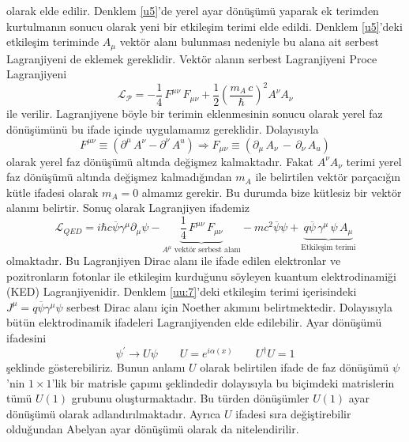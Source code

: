olarak elde edilir. Denklem \eqref{u5}'de yerel ayar dönüşümü yaparak ek terimden kurtulmanın sonucu olarak yeni bir etkileşim terimi elde edildi.  Denklem \eqref{u5}'deki etkileşim teriminde $A_{\mu}$ vektör alanı bulunması nedeniyle bu alana ait serbest Lagranjiyeni de eklemek gereklidir. Vektör alanın serbest Lagranjiyeni Proce Lagranjiyeni 
\begin{equation} \label{u6}
\mathcal{L_{P}} = -\frac{1}{4}\,F^{\mu\nu}\,F_{\mu\nu} + \frac{1}{2}\left(\frac{m_{A}\,c}{\hbar}\right)^{2}A^{\nu}A_{\nu}
\end{equation}
ile verilir. Lagranjiyene böyle bir terimin eklenmesinin sonucu olarak yerel faz dönüşümünü bu ifade içinde uygulamamız gereklidir. Dolayısıyla 
\begin{equation*}
F^{\mu\nu}\equiv (\partial^{\mu}\,A^{\nu} - \partial^{\nu}\,A^{u} ) \Rightarrow F_{\mu\nu}\equiv (\partial_{\mu}\,A_{\nu}\,- \, \partial_{\nu}\,A_{u} )
\end{equation*}
olarak yerel faz dönüşümü altında değişmez kalmaktadır. Fakat $A^{\nu}A_{\nu}$ terimi yerel faz dönüşümü altında değişmez kalmadığından $m_{A}$ ile belirtilen vektör parçacığın kütle ifadesi olarak $m_{A} = 0$ almamız gerekir. Bu durumda bize kütlesiz bir vektör alanını belirtir. Sonuç olarak Lagranjiyen ifademiz
\begin{equation} \label{u7}
\mathcal{L}_{QED} =  i\hbar c\overline{\psi}\gamma^{\mu}\partial_{\mu} \psi -\underbrace{\frac{1}{4}\,F^{\mu\nu}\,F_{\mu\nu}}_{A^{\mu} \textrm{ vektör serbest alanı}} - mc^{2}\overline{\psi}\psi  + \underbrace{ q \overline{\psi}\,\gamma^{\mu} \,\psi \,A_{\mu}}_{\textrm{Etkileşim terimi}}
\end{equation}
olmaktadır. Bu Lagranjiyen Dirac alanı ile ifade edilen elektronlar ve pozitronların fotonlar ile etkileşim kurduğunu söyleyen kuantum elektrodinamiği (KED) Lagranjiyenidir. Denklem \eqref{uu:7}'deki etkileşim terimi içerisindeki $J^{\mu} = q\overline{\psi}\gamma^{\mu}\psi$ serbest Dirac alanı için Noether akımını belirtmektedir. Dolayısıyla bütün elektrodinamik ifadeleri Lagranjiyenden elde edilebilir. Ayar dönüşümü ifadesini
$$
\psi^{'} \to U \psi\qquad U = e^{i\alpha(x)} \qquad U^{\dag}U = 1 
$$
şeklinde gösterebiliriz. Bunun anlamı $U$ olarak belirtilen ifade de faz dönüşümü $\psi$'nin $1 \times 1$'lik bir matrisle çapımı şeklindedir dolayısıyla bu biçimdeki matrislerin tümü $U(1)$ grubunu oluşturmaktadır. Bu türden dönüşümler $U(1)$ ayar dönüşümü olarak adlandırılmaktadır. Ayrıca $U$ ifadesi sıra değiştirebilir olduğundan Abelyan ayar dönüşümü olarak da nitelendirilir.
